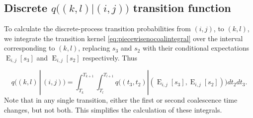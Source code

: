 \documentclass{article}
\DeclareMathOperator{\E}{E}
\begin{document}
\subsection{Discrete $q\big((k,l)|(i,j)\big)$ transition function}

To calculate the discrete-process transition probabilities from $(i,j)$, to
$(k,l)$, we integrate the transition kernel \eqref{eq:piecewisenocoalintegral}
over the interval corresponding to $(k,l)$, replacing $s_3$ and $s_2$ with
their conditional expectations $\E_{i,j}[s_3]$ and $\E_{i,j}[s_2]$
respectively. Thus


\begin{equation}
    q\Big((k,l)\,|\,(i,j)\Big) = 
    \int_{T_k}^{T_{k+1}}\int_{T_l}^{T_{l+1}}q\Big((t_3,t_2)|\left(\E_{i,j}[s_3],\E_{i,j}[s_2]\right)\Big)dt_2dt_3.
\end{equation}
Note that in any single transition, either the first or second coalescence time
changes, but not both. This simplifies the calculation of these integrals.

\end{document}
